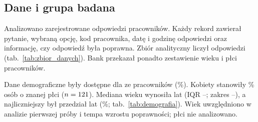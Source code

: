 \subsection{Dane i grupa badana}
\label{sec:dane}
Analizowano zarejestrowane odpowiedzi pracowników. Każdy rekord zawierał pytanie, wybraną opcję,
kod pracownika, datę i godzinę odpowiedzi oraz informację, czy odpowiedź była poprawna. Zbiór analityczny liczył \NResponses{} odpowiedzi
(tab.~\ref{tab:zbior_danych}). Bank przekazał ponadto zestawienie wieku i płci pracowników.

\begin{table}[H] 
\centering
\caption{Charakterystyka zbioru danych.}
\label{tab:zbior_danych} 
\small
{}
\end{table}

Dane demograficzne były dostępne dla \DemoMatched{} ze \DemoN{} pracowników (\DemoMatchedPct\%).
Kobiety stanowiły \DemoWomenPct\% osób o znanej płci ($n = 121$). Mediana wieku wynosiła
\AgeMedian{} lat (IQR \AgeQOne--\AgeQThree; zakres \AgeMin--\AgeMax), a najliczniejszy był przedział
\AgeModalGroup{} lat (\AgeModalGroupPct\%; tab.~\ref{tab:demografia}). Wiek uwzględniono w analizie
pierwszej próby i tempa wzrostu poprawności; płci nie analizowano.

\begin{table}[H]
\centering
\caption{Charakterystyka demograficzna pracowników objętych analizą.}
\label{tab:demografia}
\small
{}
\end{table} 


